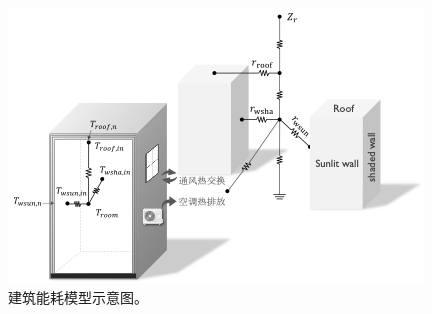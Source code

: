 {
\begin{figure}[htbp]
\centering
\includegraphics{Figures/城市模式/建筑能耗模型示意图.png}
\caption{建筑能耗模型示意图。}
\label{fig:建筑能耗模型示意图}
\end{figure}
}

